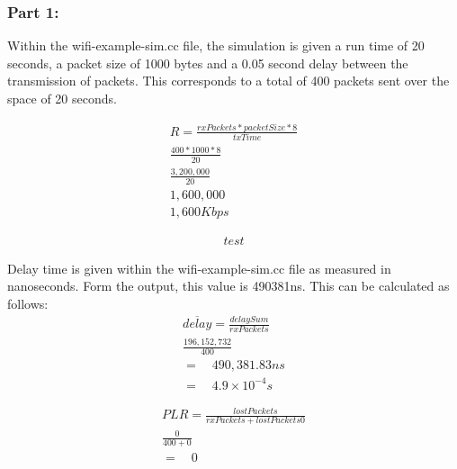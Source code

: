 \subsubsection{Part 1:}

Within the wifi-example-sim.cc file, the simulation is given a run time of 20
seconds, a packet size of 1000 bytes and a 0.05 second delay between the
transmission of packets. This corresponds to a total of 400 packets sent over
the space of 20 seconds.

\begin{gather*}
	R=\frac{rxPackets*packetSize*8}{txTime} \\
	\frac{400*1000*8}{20} \\
	\frac{3,200,000}{20} \\
	1,600,000 \\
	1,600Kbps
\end{gather*}

\begin{gather*}
	test
\end{gather*}

\par Delay time is given within the wifi-example-sim.cc file as measured in
nanoseconds. Form the output, this value is 490381ns. This can be calculated as
follows:
\begin{gather*}
	\overline{delay}=\frac{delaySum}{rxPackets} \\
	\frac{196,152,732}{400} \\
	= \quad 490,381.83ns \\
	= \quad 4.9\times10^{-4}s
\end{gather*}

\begin{gather*}
	PLR = \frac{lostPackets}{rxPackets+lostPackets0} \\
	\frac{0}{400+0} \\
	= \quad 0
\end{gather*}

